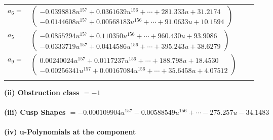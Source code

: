 \documentclass[1p]{elsarticle_modified}
\theoremstyle{definition}
\begin{document}
\begin{tabular}{m{7pt} m{180pt} m{7pt} m{180pt} }
\flushright $a_{6}=$&$\begin{pmatrix}-0.0398818 u^{157}+0.0361639 u^{156}+\cdots+281.333 u+31.2174\\-0.0144608 u^{157}+0.00568183 u^{156}+\cdots+91.0633 u+10.1594\end{pmatrix}$ \\
\flushright $a_{5}=$&$\begin{pmatrix}-0.0855294 u^{157}+0.110350 u^{156}+\cdots+960.430 u+93.9086\\-0.0333719 u^{157}+0.0414586 u^{156}+\cdots+395.243 u+38.6279\end{pmatrix}$ \\
\flushright $a_{9}=$&$\begin{pmatrix}0.00240024 u^{157}+0.0117237 u^{156}+\cdots+188.798 u+18.4530\\-0.00256341 u^{157}+0.00167084 u^{156}+\cdots+35.6458 u+4.07512\end{pmatrix}$\\&\end{tabular}
\flushleft \textbf{(ii) Obstruction class $= -1$}\\~\\
\flushleft \textbf{(iii) Cusp Shapes $= -0.000109904 u^{157}-0.00588549 u^{156}+\cdots-275.257 u-34.1483$}\\~\\
\newpage\renewcommand{\arraystretch}{1}
\flushleft \textbf{(iv) u-Polynomials at the component}\newline \\
\end{document}
